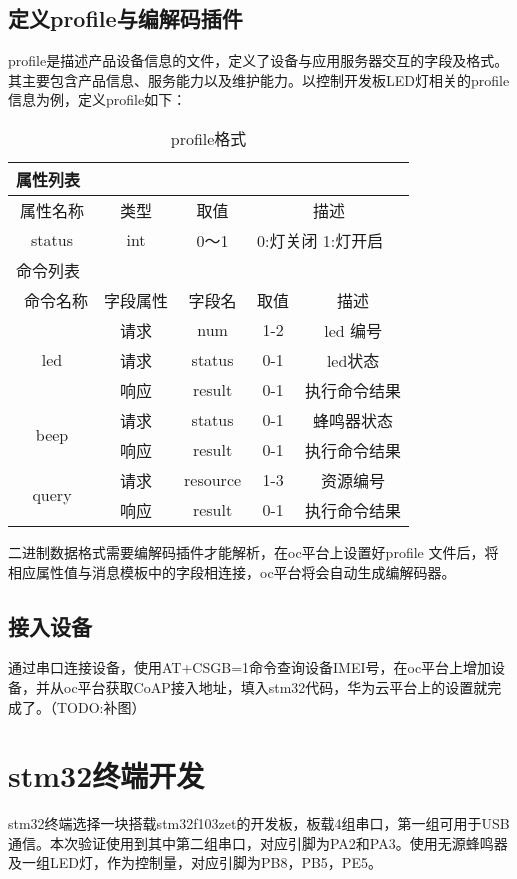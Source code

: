 \subsection{定义profile与编解码插件}
profile是描述产品设备信息的文件，定义了设备与应用服务器交互的字段及格式。其主要包含产品信息、服务能力以及维护能力。以控制开发板LED灯相关的profile信息为例，定义profile如下：
\begin{table}[h]
\caption{profile格式}
\begin{tabular}{|c|c|c|c|c|}
\toprule
\multicolumn{5}{|l|}{属性列表} \\
\hline
属性名称 & 类型 & 取值 & \multicolumn{2}{|c|}{描述}  \\
\hline
status & int & 0～1 & \multicolumn{2}{|l|}{0:灯关闭 1:灯开启} \\
\toprule
\multicolumn{5}{|l|}{命令列表} \\
\hline\
命令名称 & 字段属性 & 字段名 & 取值 & 描述\\
\hline
\multirow{3}{*}{led} & 请求 & num & 1-2 & led 编号 \\
\cmidrule{2-5}
                     & 请求 & status & 0-1 & led状态 \\
\cmidrule{2-5}
                     & 响应 & result & 0-1 & 执行命令结果 \\
\hline
\multirow{2}{*}{beep} & 请求 & status & 0-1 & 蜂鸣器状态 \\
\cmidrule{2-5}
                      & 响应 & result & 0-1 & 执行命令结果 \\
\hline
\multirow{2}{*}{query} & 请求 & resource & 1-3 & 资源编号 \\
\cmidrule{2-5}
                      & 响应 & result & 0-1 & 执行命令结果 \\
\bottomrule
\end{tabular}
\label{tablea}
\end{table}

二进制数据格式需要编解码插件才能解析，在oc平台上设置好profile 文件后，将相应属性值与消息模板中的字段相连接，oc平台将会自动生成编解码器。

\subsection{接入设备}
通过串口连接设备，使用AT+CSGB=1命令查询设备IMEI号，在oc平台上增加设备，并从oc平台获取CoAP接入地址，填入stm32代码，华为云平台上的设置就完成了。（TODO:补图）


\section{stm32终端开发}
stm32终端选择一块搭载stm32f103zet的开发板，板载4组串口，第一组可用于USB通信。本次验证使用到其中第二组串口，对应引脚为PA2和PA3。使用无源蜂鸣器及一组LED灯，作为控制量，对应引脚为PB8，PB5，PE5。


